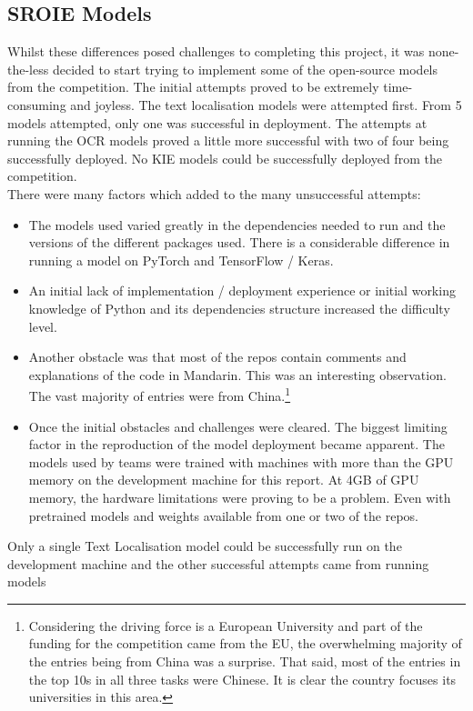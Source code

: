 \subsection{SROIE Models}
Whilst these differences posed challenges to completing this project, it was none-the-less decided to start trying to implement some of the open-source models
from the competition. The initial attempts proved to be extremely time-consuming and joyless. The text localisation models were attempted first. From
5 models attempted, only one was successful in deployment.
\bigbreak
The attempts at running the OCR models proved a little more successful with two of four being successfully deployed. No KIE models could be successfully
deployed from the competition.\\
There were many factors which added to the many unsuccessful attempts:
\begin{itemize}
	\item The models used varied greatly in the dependencies needed to run and the versions of the different packages used. There is a considerable
	      difference in running a model on PyTorch and TensorFlow / Keras.
	\item An initial lack of implementation / deployment experience or initial working knowledge of Python and its dependencies structure
	      increased the difficulty level.
	\item Another obstacle was that most of the repos contain comments and explanations of the code in Mandarin. This was an interesting observation.
	      The vast majority of entries were from China.\footnote{Considering the driving force is a European University and part of the funding for the competition came
		      from the EU, the overwhelming majority of the entries being from China was a surprise. That said, most of the entries in the top 10s in all three tasks
		      were Chinese. It is clear the country focuses its universities in this area.}
	\item Once the initial obstacles and challenges were cleared. The biggest limiting factor in the reproduction of the model deployment became apparent.
	      The models used by teams were trained with machines with more than the GPU memory on the development machine for this report. At 4GB of GPU memory, the
	      hardware limitations were proving to be a problem. Even with pretrained models and weights available from one or two of the repos.
\end{itemize}
Only a single Text Localisation model could be successfully run on the development machine and the other successful attempts came from running models
